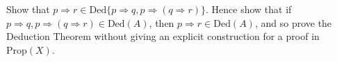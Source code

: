 Show that $p \Rightarrow r \in \text{Ded}\{p \Rightarrow q, p \Rightarrow (q \Rightarrow r)\}$. Hence show that if $p \Rightarrow q, p \Rightarrow (q \Rightarrow r) \in \text{Ded}(A)$, then $p \Rightarrow r \in \text{Ded}(A)$, and so prove the Deduction Theorem without giving an explicit construction for a proof in $\text{Prop}(X)$.
